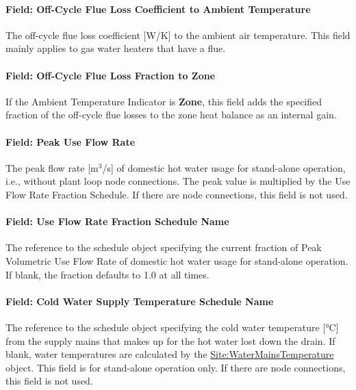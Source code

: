 \paragraph{Field: Off-Cycle Flue Loss Coefficient to Ambient Temperature}\label{field-off-cycle-flue-loss-coefficient-to-ambient-temperature}

The off-cycle flue loss coefficient {[}W/K{]} to the ambient air temperature. This field mainly applies to gas water heaters that have a flue.

\paragraph{Field: Off-Cycle Flue Loss Fraction to Zone}\label{field-off-cycle-flue-loss-fraction-to-zone}

If the Ambient Temperature Indicator is \textbf{Zone}, this field adds the specified fraction of the off-cycle flue losses to the zone heat balance as an internal gain.

\paragraph{Field: Peak Use Flow Rate}\label{field-peak-use-flow-rate-1}

The peak flow rate {[}m\(^{3}\)/s{]} of domestic hot water usage for stand-alone operation, i.e., without plant loop node connections. The peak value is multiplied by the Use Flow Rate Fraction Schedule. If there are node connections, this field is not used.

\paragraph{Field: Use Flow Rate Fraction Schedule Name}\label{field-use-flow-rate-fraction-schedule-name-1}

The reference to the schedule object specifying the current fraction of Peak Volumetric Use Flow Rate of domestic hot water usage for stand-alone operation. If blank, the fraction defaults to 1.0 at all times.

\paragraph{Field: Cold Water Supply Temperature Schedule Name}\label{field-cold-water-supply-temperature-schedule-name-1}

The reference to the schedule object specifying the cold water temperature {[}°C{]} from the supply mains that makes up for the hot water lost down the drain. If blank, water temperatures are calculated by the \hyperref[sitewatermainstemperature]{Site:WaterMainsTemperature} object. This field is for stand-alone operation only. If there are node connections, this field is not used.

